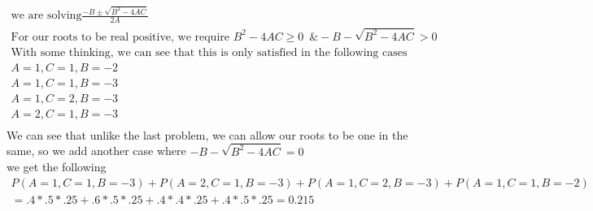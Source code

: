 \documentclass[11pt]{article}
\begin{document}
\begin{enumerate}
\begin{enumerate}
	\begin{gather}
	\text{we are solving} \frac{-B \pm \sqrt{B^2-4AC}}{2A}\\
	\text{For our roots to be real positive, we require } B^2-4AC \ge 0 \, \, \, \& -B - \sqrt{B^2-4AC} > 0\\
	\text{With some thinking, we can see that this is only satisfied in the following cases}\\
	A=1,C=1,B=-2\\
	A=1,C=1,B=-3\\
	A=1,C=2,B=-3\\
	A=2,C=1,B=-3\\
	\end{gather}
	We can see that unlike the last problem, we can allow our roots to be one in the same, so we add another case where $-B - \sqrt{B^2-4AC} = 0$\\
	we get the following
	\begin{gather}
	P(A=1,C=1,B=-3)+P(A=2,C=1,B=-3)+P(A=1,C=2,B=-3)+P(A=1,C=1,B=-2)\\
	= .4*.5*.25+.6*.5*.25+.4*.4*.25+.4*.5*.25 = 0.215
	\end{gather}
\end{enumerate}
\end{enumerate}
\end{document}
